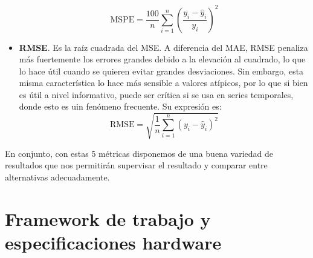 \begin{itemize}
	$$
	\mathrm{MSPE} = \frac{100}{n} \sum_{i=1}^n \left( \frac{y_i - \hat{y}_i}{y_i} \right)^2
	$$
	
	\item \textbf{RMSE}. Es la raíz cuadrada del MSE. A diferencia del MAE, RMSE penaliza más fuertemente los errores grandes debido a la elevación al cuadrado, lo que lo hace útil cuando se quieren evitar grandes desviaciones. Sin embargo, esta misma característica lo hace más sensible a valores atípicos, por lo que si bien es útil a nivel informativo, puede ser crítica si se usa en series temporales, donde esto es uin fenómeno frecuente. Su expresión es:
	$$
	\mathrm{RMSE} = \sqrt{\frac{1}{n} \sum_{i=1}^n (y_i - \hat{y}_i)^2}
	$$
\end{itemize}

En conjunto, con estas 5 métricas disponemos de una buena variedad de resultados que nos permitirán supervisar el resultado y comparar entre alternativas adecuadamente.


\section{Framework de trabajo y especificaciones hardware}

